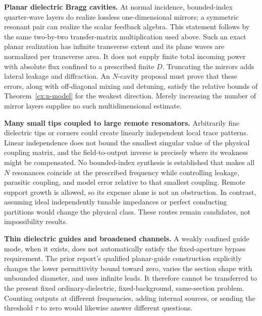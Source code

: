 \medskip
\noindent\textbf{Planar dielectric Bragg cavities.}
At normal incidence, bounded-index quarter-wave layers do realize
lossless one-dimensional mirrors; a symmetric resonant pair can realize
the scalar feedback algebra. This statement follows by the same
two-by-two transfer-matrix multiplication used above. Such an exact
planar realization has infinite transverse extent and its plane waves
are normalized per transverse area. It does not supply finite total
incoming power with absolute flux confined to a prescribed finite $D$.
Truncating the mirrors adds lateral leakage and diffraction. An $N$-cavity
proposal must prove that these errors, along with off-diagonal mixing and
detuning, satisfy the relative bounds of
Theorem~\ref{cx:n-model} for the weakest direction. Merely increasing
the number of mirror layers supplies no such multidimensional estimate.

\medskip
\noindent\textbf{Many small tips coupled to large remote resonators.}
Arbitrarily fine dielectric tips or corners could create linearly
independent local trace patterns. Linear independence does not bound
the smallest singular value of the physical coupling matrix, and the
field-to-output inverse is precisely where its weakness might be
compensated. No bounded-index synthesis is established that makes all
$N$ resonances coincide at the prescribed frequency while controlling
leakage, parasitic coupling, and model error relative to that smallest
coupling. Remote support growth is allowed, so its expense alone is not
an obstruction. In contrast, assuming ideal independently tunable
impedances or perfect conducting partitions would change the physical
class. These routes remain candidates, not impossibility results.

\medskip
\noindent\textbf{Thin dielectric guides and broadened channels.}
A weakly confined guide mode, when it exists, does not automatically
satisfy the fixed-aperture bypass requirement. The prior report's
qualified planar-guide construction explicitly changes the lower
permittivity bound toward zero, varies the section shape with unbounded
diameter, and uses infinite leads. It therefore cannot be transferred
to the present fixed ordinary-dielectric, fixed-background, same-section
problem. Counting outputs at different frequencies, adding internal
sources, or sending the threshold $\tau$ to zero would likewise answer
different questions.

